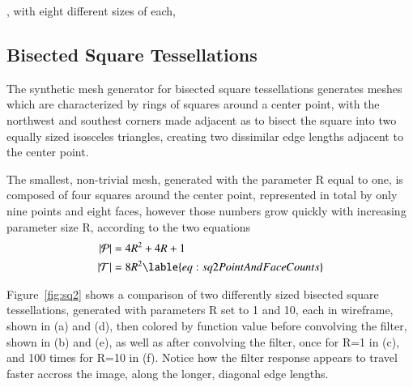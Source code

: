 , with eight different sizes of each,
%
%
%
%
\pagebreak
\subsection{Bisected Square Tessellations}
The synthetic mesh generator for bisected square tessellations generates meshes which are characterized by rings of squares around a center point, with the northwest and southest corners made adjacent as to bisect the square into two equally sized isosceles triangles, creating two dissimilar edge lengths adjacent to the center point.

The smallest, non-trivial mesh, generated with the parameter R equal to one, is composed of four squares around the center point, represented in total by only nine points and eight faces, however those numbers grow quickly
with increasing parameter size R, according to the two equations
\begin{align}
	|\bP| &= 4R^2 + 4R + 1 \\
	|\bT| &= 8R^2
	\lable{eq:sq2PointAndFaceCounts}
\end{align}


Figure~\ref{fig:sq2} shows a comparison of two differently sized bisected square tessellations, generated with parameters R set to 1 and 10, each in wireframe, shown in (a) and (d), then colored by function value before convolving the filter, shown in (b) and (e), as well as after convolving the filter, once for R=1 in (c), and 100 times for R=10 in (f). Notice how the filter response appears to travel faster accross the image, along the longer, diagonal edge lengths.

